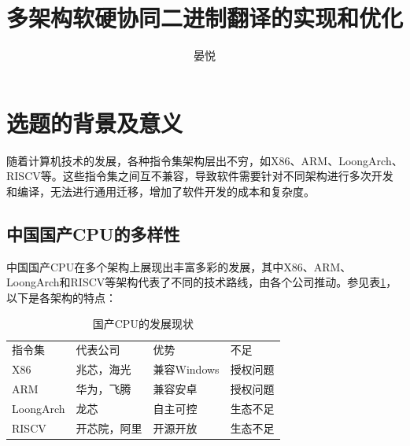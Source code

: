 \documentclass{Style/ucasproposal}%
\title{多架构软硬协同二进制翻译的实现和优化}%
\author{晏悦}%
\institute{中国科学院计算技术研究所}%
\begin{document}

\maketitle%
\tableofcontents%
\clearpage
{}%

\section{选题的背景及意义}

随着计算机技术的发展，各种指令集架构层出不穷，如X86、ARM、LoongArch\cite{LoongArch2023}、RISCV等。这些指令集之间互不兼容，导致软件需要针对不同架构进行多次开发和编译，无法进行通用迁移，增加了软件开发的成本和复杂度。

\subsection{中国国产CPU的多样性}

中国国产CPU在多个架构上展现出丰富多彩的发展，其中X86、ARM、LoongArch和RISCV等架构代表了不同的技术路线，由各个公司推动。参见表\ref{tab:CPUs}，以下是各架构的特点：

\begin{table}[]
\centering
\caption{国产CPU的发展现状}
\label{tab:CPUs}
    \begin{tabular}{llll}
    \rowcolor[HTML]{FBE5D6} 
    指令集       & 代表公司   & 优势        & 不足         \\
    X86       & 兆芯，海光  & 兼容Windows & 授权问题 \\
    ARM       & 华为，飞腾  & 兼容安卓      & 授权问题       \\
    LoongArch & 龙芯     & 自主可控      & 生态不足       \\
    RISCV     & 开芯院，阿里 & 开源开放      & 生态不足      
    \end{tabular}
    \end{table}
\end{document}
